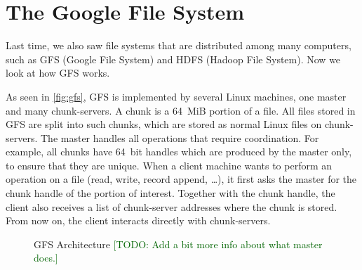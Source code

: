 \section{The Google File System}

Last time, we also saw file systems that are distributed among many computers,
  such as GFS (Google File System) and HDFS (Hadoop File System).
Now we look at how GFS works.

As seen in \autoref{fig:gfs},
  GFS is implemented by several Linux machines,
  one master and many chunk-servers.
A chunk is a 64~MiB portion of a file.
All files stored in GFS are split into such chunks,
  which are stored as normal Linux files on chunk-servers.
The master handles all operations that require coordination.
For example,
  all chunks have 64~bit handles which are produced by the master only,
  to ensure that they are unique.
When a client machine wants to perform an operation on a file
  (read, write, record append, \dots),
  it first asks the master for the chunk handle of the portion of interest.
Together with the chunk handle,
  the client also receives a list of chunk-server addresses
  where the chunk is stored.
From now on, the client interacts directly with chunk-servers.

\begin{figure} %
\begin{center}
\end{center}
\caption{GFS Architecture
\textcolor{darkgreen}{[TODO: Add a bit more info about what master does.]}
}\label{fig:gfs}
\end{figure}


